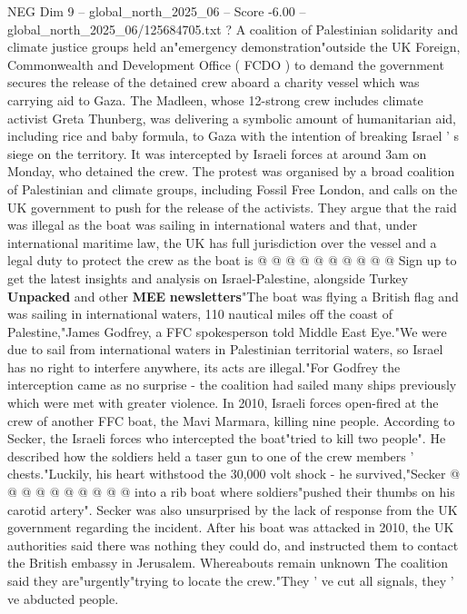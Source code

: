 \begin{textsample}{NEG Dim 9 – global\_north\_2025\_06 – Score -6.00 – global\_north\_2025\_06/125684705.txt}  \label{ex:f9_neg_084}
?
A coalition of Palestinian solidarity and climate justice groups held an"emergency demonstration"outside the UK Foreign, Commonwealth and Development Office ( FCDO ) to demand the government secures the release of the detained crew aboard a charity vessel which was carrying aid to Gaza.
The Madleen, whose 12-strong crew includes climate activist Greta Thunberg, was delivering a symbolic amount of humanitarian aid, including rice and baby formula, to Gaza with the intention of breaking Israel ' s siege on the territory.
It was intercepted by Israeli forces at around 3am on Monday, who detained the crew.
The protest was organised by a broad coalition of Palestinian and climate groups, including Fossil Free London, and calls on the UK government to push for the release of the activists.
They argue that the raid was illegal as the boat was sailing in international waters and that, under international maritime law, the UK has full jurisdiction over the vessel and a legal duty to protect the crew as the boat is @ @ @ @ @ @ @ @ @ @ Sign up to get the latest insights and analysis on Israel-Palestine, alongside Turkey \textbf{Unpacked} and other \textbf{MEE} \textbf{newsletters}"The boat was flying a British flag and was sailing in international waters, 110 nautical miles off the coast of Palestine,"James Godfrey, a FFC spokesperson told Middle East Eye."We were due to sail from international waters in Palestinian territorial waters, so Israel has no right to interfere anywhere, its acts are illegal."For Godfrey the interception came as no surprise - the coalition had sailed many ships previously which were met with greater violence.
In 2010, Israeli forces open-fired at the crew of another FFC boat, the Mavi Marmara, killing nine people.
According to Secker, the Israeli forces who intercepted the boat"tried to kill two people".
He described how the soldiers held a taser gun to one of the crew members ' chests."Luckily, his heart withstood the 30,000 volt shock - he survived,"Secker @ @ @ @ @ @ @ @ @ @ into a rib boat where soldiers"pushed their thumbs on his carotid artery".
Secker was also unsurprised by the lack of response from the UK government regarding the incident.
After his boat was attacked in 2010, the UK authorities said there was nothing they could do, and instructed them to contact the British embassy in Jerusalem.
Whereabouts remain unknown The coalition said they are"urgently"trying to locate the crew."They ' ve cut all signals, they ' ve abducted people.

\end{textsample}

